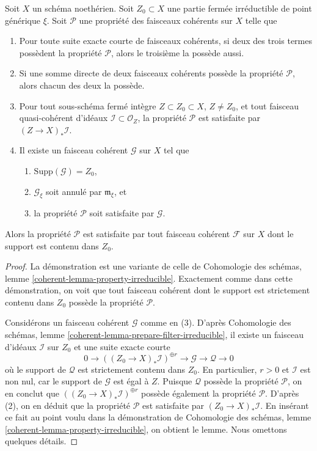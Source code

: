\begin{lemma}
\label{lemma-property-irreducible-higher-rank}
Soit $X$ un schéma noethérien.
Soit $Z_0 \subset X$ une partie fermée irréductible de point générique $\xi$.
Soit $\mathcal{P}$ une propriété des faisceaux cohérents sur $X$ telle que
\begin{enumerate}
\item Pour toute suite exacte courte de faisceaux cohérents, si deux
des trois termes possèdent la propriété $\mathcal{P}$, alors le troisième
la possède aussi.
\item Si une somme directe de deux faisceaux cohérents possède la propriété
$\mathcal{P}$, alors chacun des deux la possède.
\item Pour tout sous-schéma fermé intègre $Z \subset Z_0 \subset X$,
$Z \not = Z_0$, et tout faisceau quasi-cohérent d'idéaux
$\mathcal{I} \subset \mathcal{O}_Z$, la propriété $\mathcal{P}$ est satisfaite
par $(Z \to X)_*\mathcal{I}$.
\item Il existe un faisceau cohérent $\mathcal{G}$ sur $X$ tel que
\begin{enumerate}
\item $\text{Supp}(\mathcal{G}) = Z_0$,
\item $\mathcal{G}_\xi$ soit annulé par $\mathfrak m_\xi$, et
\item la propriété $\mathcal{P}$ soit satisfaite par $\mathcal{G}$.
\end{enumerate}
\end{enumerate}
Alors la propriété $\mathcal{P}$ est satisfaite par tout faisceau cohérent
$\mathcal{F}$ sur $X$ dont le support est contenu dans $Z_0$.
\end{lemma}

\begin{proof}
La démonstration est une variante de celle de
Cohomologie des schémas, lemme \ref{coherent-lemma-property-irreducible}.
Exactement comme dans cette démonstration, on voit que
tout faisceau cohérent dont le support est strictement contenu dans $Z_0$
possède la propriété $\mathcal{P}$.

\medskip\noindent
Considérons un faisceau cohérent $\mathcal{G}$ comme en (3).
D'après Cohomologie des schémas, lemme \ref{coherent-lemma-prepare-filter-irreducible},
il existe un faisceau d'idéaux $\mathcal{I}$ sur $Z_0$ et
une suite exacte courte
$$
0 \to
\left((Z_0 \to X)_*\mathcal{I}\right)^{\oplus r} \to
\mathcal{G} \to
\mathcal{Q} \to 0
$$
où le support de $\mathcal{Q}$ est strictement contenu dans $Z_0$.
En particulier, $r > 0$ et $\mathcal{I}$ est non nul,
car le support de $\mathcal{G}$ est égal à $Z$.
Puisque $\mathcal{Q}$ possède la propriété $\mathcal{P}$, on en conclut que
$\left((Z_0 \to X)_*\mathcal{I}\right)^{\oplus r}$
possède également la propriété $\mathcal{P}$.
D'après (2), on en déduit que la propriété $\mathcal{P}$ est satisfaite par
$(Z_0 \to X)_*\mathcal{I}$. En insérant ce fait au point voulu dans la démonstration de
Cohomologie des schémas, lemme \ref{coherent-lemma-property-irreducible},
on obtient le lemme.
Nous omettons quelques détails.
\end{proof}

